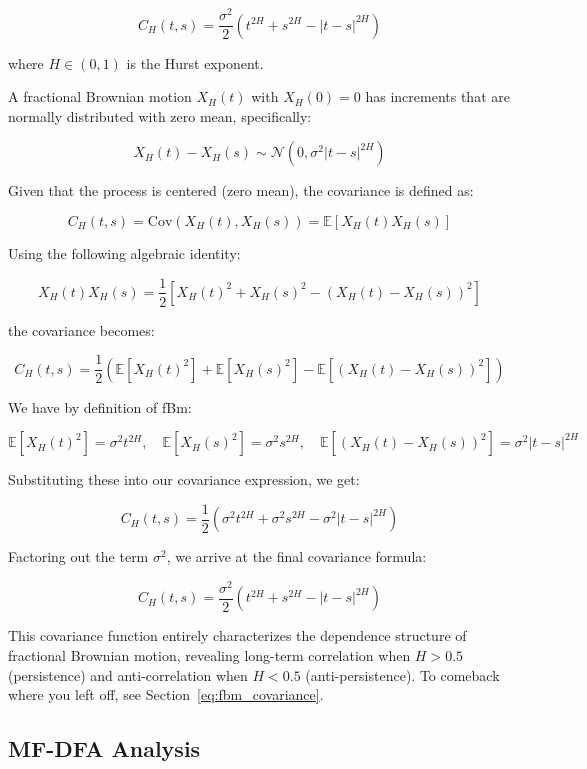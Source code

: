 \documentclass[11pt]{extarticle}
\begin{document}
\[
C_H(t,s) = \frac{\sigma^2}{2}\left(t^{2H}+s^{2H}-|t-s|^{2H}\right)
\]

where \( H \in (0,1) \) is the Hurst exponent.

A fractional Brownian motion \( X_H(t) \) with \( X_H(0)=0 \) has increments that are normally distributed with zero mean, specifically:

\[
X_H(t)-X_H(s) \sim \mathcal{N}(0,\sigma^2|t-s|^{2H})
\]

Given that the process is centered (zero mean), the covariance is defined as:

\[
C_H(t,s) = \text{Cov}(X_H(t), X_H(s)) = \mathbb{E}[X_H(t)X_H(s)]
\]

Using the following algebraic identity:

\[
X_H(t)X_H(s) = \frac{1}{2}\left[X_H(t)^2 + X_H(s)^2 - (X_H(t)-X_H(s))^2\right]
\]

the covariance becomes:

\[
C_H(t,s) = \frac{1}{2}\left(\mathbb{E}[X_H(t)^2]+\mathbb{E}[X_H(s)^2]-\mathbb{E}[(X_H(t)-X_H(s))^2]\right)
\]


We have by definition of fBm:

\[
\mathbb{E}[X_H(t)^2] = \sigma^2 t^{2H}, \quad \mathbb{E}[X_H(s)^2] = \sigma^2 s^{2H}, \quad \mathbb{E}[(X_H(t)-X_H(s))^2] = \sigma^2 |t-s|^{2H}
\]

Substituting these into our covariance expression, we get:

\[
C_H(t,s) = \frac{1}{2}\left(\sigma^2 t^{2H} + \sigma^2 s^{2H} - \sigma^2 |t-s|^{2H}\right)
\]


Factoring out the term \( \sigma^2 \), we arrive at the final covariance formula:

\[
\boxed{C_H(t,s) = \frac{\sigma^2}{2}\left(t^{2H} + s^{2H} - |t-s|^{2H}\right)}
\]

This covariance function entirely characterizes the dependence structure of fractional Brownian motion, revealing long-term correlation when \(H>0.5\) (persistence) and anti-correlation when \(H<0.5\) (anti-persistence).
To comeback where you left off, see Section~\ref{eq:fbm_covariance}. \\


\subsection{MF-DFA Analysis}
\end{document}
